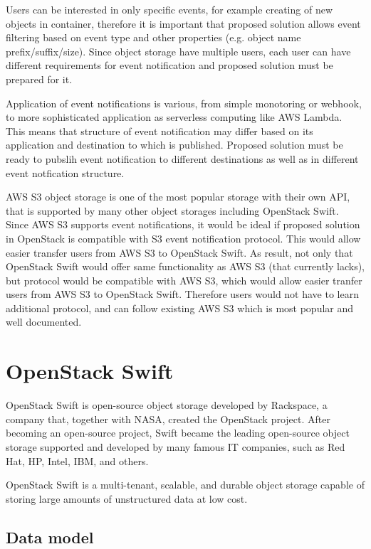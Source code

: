 \documentclass{ExcelAtFIT}
\begin{document}
Users can be interested in only specific events, for example creating of new objects in container, therefore it is important that proposed solution allows event filtering based on event type and other properties (e.g. object name prefix/suffix/size). Since object storage have multiple users, each user can have different requirements for event notification and proposed solution must be prepared for it.

Application of event notifications is various, from simple monotoring or webhook, to more sophisticated application as serverless computing like AWS Lambda. This means that structure of event notification may differ based on its application and destination to which is published. Proposed solution must be ready to pubslih event notification to different destinations as well as in different event notfication structure.

AWS S3 object storage is one of the most popular storage with their own API, that is supported by many other object storages including OpenStack Swift. Since AWS S3 supports event notifications, it would be ideal if proposed solution in OpenStack is compatible with S3 event notification protocol. This would allow easier transfer users from AWS S3 to OpenStack Swift. As result, not only that OpenStack Swift would offer same functionality as AWS S3 (that currently lacks), but protocol would be compatible with AWS S3, which would allow easier tranfer users from AWS S3 to OpenStack Swift. Therefore users would not have to learn additional protocol, and can follow existing AWS S3 which is most popular and well documented.


\section{OpenStack Swift}

OpenStack Swift is open-source object storage developed by Rackspace, a company that, together with NASA, created the OpenStack project. After becoming an open-source project, Swift became the leading open-source object storage supported and developed by many famous IT companies, such as Red Hat, HP, Intel, IBM, and others.

OpenStack Swift is a multi-tenant, scalable, and durable object storage capable of storing large amounts of unstructured data at low cost\cite{swiftOpenStackSwift}.

\subsection{Data model}
\end{document}
